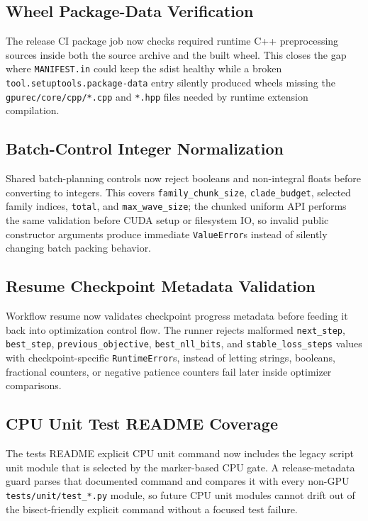 \documentclass[11pt]{article}
\begin{document}
\subsection{Wheel Package-Data Verification}

The release CI package job now checks required runtime C++ preprocessing sources
inside both the source archive and the built wheel.  This closes the gap where
\texttt{MANIFEST.in} could keep the sdist healthy while a broken
\texttt{tool.setuptools.package-data} entry silently produced wheels missing the
\texttt{gpurec/core/cpp/*.cpp} and \texttt{*.hpp} files needed by runtime
extension compilation.

\subsection{Batch-Control Integer Normalization}

Shared batch-planning controls now reject booleans and non-integral floats
before converting to integers.  This covers \texttt{family\_chunk\_size},
\texttt{clade\_budget}, selected family indices, \texttt{total}, and
\texttt{max\_wave\_size}; the chunked uniform API performs the same validation
before CUDA setup or filesystem IO, so invalid public constructor arguments
produce immediate \texttt{ValueError}s instead of silently changing batch
packing behavior.

\subsection{Resume Checkpoint Metadata Validation}

Workflow resume now validates checkpoint progress metadata before feeding it
back into optimization control flow.  The runner rejects malformed
\texttt{next\_step}, \texttt{best\_step}, \texttt{previous\_objective},
\texttt{best\_nll\_bits}, and \texttt{stable\_loss\_steps} values with
checkpoint-specific \texttt{RuntimeError}s, instead of letting strings,
booleans, fractional counters, or negative patience counters fail later inside
optimizer comparisons.

\subsection{CPU Unit Test README Coverage}

The tests README explicit CPU unit command now includes the legacy script unit
module that is selected by the marker-based CPU gate.  A release-metadata guard
parses that documented command and compares it with every non-GPU
\texttt{tests/unit/test\_*.py} module, so future CPU unit modules cannot drift
out of the bisect-friendly explicit command without a focused test failure.
\end{document}
